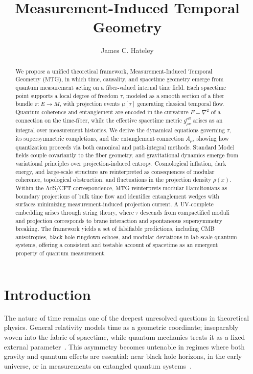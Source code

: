 \documentclass[11pt]{article}
\title{Measurement-Induced Temporal Geometry}
\author{James C. Hateley}
\date{}
\begin{document}
\maketitle
\begin{abstract}
We propose a unified theoretical framework, Measurement-Induced Temporal Geometry (MTG), in which time, causality, and spacetime geometry emerge from quantum measurement acting on a fiber-valued internal time field. Each spacetime point supports a local degree of freedom $\tau$, modeled as a smooth section of a fiber bundle $\pi: E \to M$, with projection events $\mu[\tau]$ generating classical temporal flow. Quantum coherence and entanglement are encoded in the curvature $F = \nabla^2$ of a connection on the time-fiber, while the effective spacetime metric $g_{\mu\nu}^{\mathrm{eff}}$ arises as an integral over measurement histories. We derive the dynamical equations governing $\tau$, its supersymmetric completions, and the entanglement connection $A_\mu$, showing how quantization proceeds via both canonical and path-integral methods. Standard Model fields couple covariantly to the fiber geometry, and gravitational dynamics emerge from variational principles over projection-induced entropy. Cosmological inflation, dark energy, and large-scale structure are reinterpreted as consequences of modular coherence, topological obstruction, and fluctuations in the projection density $\rho(x)$. Within the AdS/CFT correspondence, MTG reinterprets modular Hamiltonians as boundary projections of bulk time flow and identifies entanglement wedges with surfaces minimizing measurement-induced projection current. A UV-complete embedding arises through string theory, where $\tau$ descends from compactified moduli and projection corresponds to brane interaction and spontaneous supersymmetry breaking. The framework yields a set of falsifiable predictions, including CMB anisotropies, black hole ringdown echoes, and modular deviations in lab-scale quantum systems, offering a consistent and testable account of spacetime as an emergent property of quantum measurement.
\end{abstract}


\section{Introduction}\label{sec:1}
The nature of time remains one of the deepest unresolved questions in theoretical physics. General relativity models time as a geometric coordinate; inseparably woven into the fabric of spacetime, while quantum mechanics treats it as a fixed external parameter~\cite{isham1993canonical}. This asymmetry becomes untenable in regimes where both gravity and quantum effects are essential: near black hole horizons, in the early universe, or in measurements on entangled quantum systems~\cite{milekhin2024measurement}.
\end{document}
